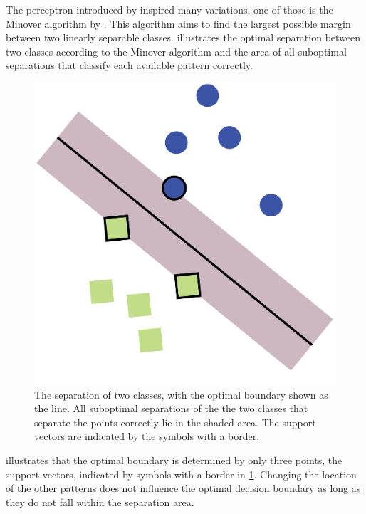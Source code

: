 
The perceptron introduced by \citeauthor{rosenblatt1958perceptron} inspired many variations, one of those is the Minover algorithm by \citeauthor{krauth1987learning}. This algorithm aims to find the largest possible margin between two linearly separable classes.  illustrates the optimal separation between two classes according to the Minover algorithm and the area of all suboptimal separations that classify each available pattern correctly. 

\begin{figure}[H]
	\centering
	\includegraphics[width=0.9\columnwidth]{./img/optimalboundary-01}
	\caption{The separation of two classes, with the optimal boundary shown as the line. All suboptimal separations of the the two classes that separate the points correctly lie in the shaded area. The support vectors are indicated by the symbols with a border.}
	\label{fig:1:optimalSolution}
\end{figure}

 illustrates that the optimal boundary is determined by only three points, the support vectors, indicated by symbols with a border in \cref{fig:1:optimalSolution}. Changing the location of the other patterns does not influence the optimal decision boundary as long as they do not fall within the separation area.

